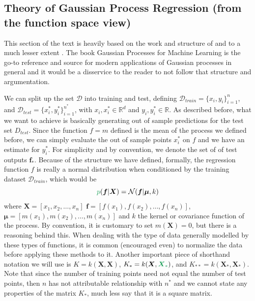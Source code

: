 \subsection{Theory of Gaussian Process Regression (from the function space view)}

This section of the text is heavily based on the work and structure of \cite{rasmussen2006gaussian} and to a much lesser extent \cite{wang2020intuitive}. The book Gaussian Processes for Machine Learning is the go-to reference and source for modern applications of Gaussian processes in general and it would be a disservice to the reader to not follow that structure and argumentation.

We can split up the set $\mathcal{D}$ into training and test, defining $\mathcal{D}_{train} = \{ x_i , y_i \}_{i=1}^n$, and $\mathcal{D}_{test} = \{ x^*_i , y^*_i \}_{i=1}^{n^*}$, with $x_i, x^*_i \in \mathbb{R}^d$ and $y_i, y^*_i \in \mathbb{R}$. As described before, what we want to achieve is basically generating out of sample predictions for the test set $D_{test}$. Since the function $f = m$ defined is the mean of the process we defined before, we can simply evaluate the out of sample points $x_i^*$ on $f$ and we have an estimate for $y_i^*$. For simplicity and by convention, we denote the set of of test outputs $\boldsymbol{f}_*$. Because of the structure we have defined, formally, the regression function $f$ is really a normal distribution when conditioned by the training dataset $\mathcal{D}_{train}$, which would be
\[ \green{p}(\boldsymbol{f} | \boldsymbol{X}) = \mathcal{N}(\boldsymbol{f} | \boldsymbol{\mu}, k) \]
where  $\boldsymbol{X} = [ x_1, x_2, \ldots , x_n ]$  $\boldsymbol{f} = [ f(x_1), f(x_2), \ldots, f(x_n) ]$, $\boldsymbol{\mu} = [ m(x_1), m(x_2), \ldots, m(x_n) ]$ and $k$ the kernel or covariance function of the process. By convention, it is customary to set $m(\boldsymbol{X}) = 0$, but there is a reasoning behind this. When dealing with the type of data generally modelled by these types of functions, it is common (encouraged even) to normalize the data before applying these methods to it. Another important piece of shorthand notation we will use is $K=k(\boldsymbol{X}, \boldsymbol{X})$, $K_*=k(\boldsymbol{X}, \green{\boldsymbol{X}_*})$, and $K_{**}=k(\boldsymbol{X}_*, \boldsymbol{X}_*)$. Note that since the number of training points need not equal the number of test points, then $n$ has not attributable relationship with $n^*$ and we cannot state any properties of the matrix $K_*$, much less say that it is a square matrix.

